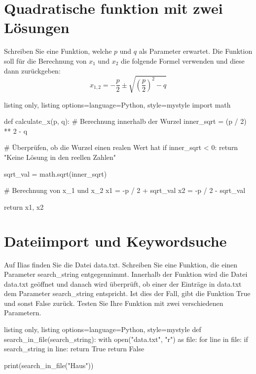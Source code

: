 \documentclass[11pt, oneside]{book}
\begin{document}
\section{Quadratische funktion mit zwei Lösungen}
Schreiben Sie eine Funktion, welche $p$ und $q$ als Parameter erwartet. Die Funktion soll f\"ur die Berechnung von $x_1$ und $x_2$ die folgende Formel verwenden und diese dann zur\"uckgeben:
\begin{equation*}
    x_{1, 2} = - \frac{p}{2} \pm \sqrt{\left( \frac{p}{2}\right)^2 -q}
\end{equation*}
\begin{tcblisting}{listing only, listing options={language=Python, style=mystyle}}
import math

def calculate_x(p, q):
    # Berechnung innerhalb der Wurzel
    inner_sqrt = (p / 2) ** 2 - q

    # Überprüfen, ob die Wurzel einen realen Wert hat
    if inner_sqrt < 0:
        return "Keine Lösung in den reellen Zahlen"

    sqrt_val = math.sqrt(inner_sqrt)

    # Berechnung von x_1 und x_2
    x1 = -p / 2 + sqrt_val
    x2 = -p / 2 - sqrt_val

    return x1, x2
\end{tcblisting}

\section{Dateiimport und Keywordsuche}
Auf Ilias finden Sie die Datei data.txt. Schreiben Sie eine Funktion, die einen Parameter search\_string entgegennimmt. Innerhalb der Funktion wird die Datei data.txt geöffnet und danach wird \"uberpr\"uft, ob einer der Einträge in data.txt dem Parameter search\_string entspricht. Ist dies der Fall, gibt die Funktion True und sonst False zur\"uck. Testen Sie Ihre Funktion mit zwei verschiedenen Parametern.
\begin{tcblisting}{listing only, listing options={language=Python, style=mystyle}}
def search_in_file(search_string):
    with open("data.txt", "r") as file:
        for line in file:
            if search_string in line:
                return True
    return False

print(search_in_file("Haus"))
\end{tcblisting}

\newpage
\end{document}
